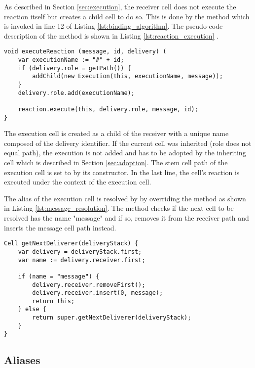 As described in Section \ref{sec:execution}, the receiver cell does not execute the reaction itself but creates a child cell to do so. This is done by the method  which is invoked in line 12 of Listing \ref{lst:binding_algorithm}. The pseudo-code description of the method is shown in Listing \ref{lst:reaction_execution} . 

\begin{lstlisting}[mathescape, float=htb, label=lst:reaction_execution, 
caption=Execution of reaction]
void executeReaction (message, id, delivery) (
	var executionName := "#" + id;
	if (delivery.role = getPath()) {
		addChild(new Execution(this, executionName, message));
	}
	delivery.role.add(executionName);

	reaction.execute(this, delivery.role, message, id);
}
\end{lstlisting}

The execution cell is created as a child of the receiver with a unique name composed of the delivery identifier. If the current cell was inherited (role does not equal path), the execution is not added and has to be adopted by the inheriting cell which is described in Section \ref{sec:adoption}. The stem cell path of the execution cell is set to  by its constructor. In the last line, the cell's reaction is executed under the context of the execution cell.

The  alias of the execution cell is resolved by  by overriding the  method as shown in Listing \ref{lst:message_resolution}. The method checks if the next cell to be resolved has the name "message" and if so, removes it from the receiver path and inserts the message cell path instead.

\begin{lstlisting}[mathescape, float=htb, label=lst:message_resolution, 
caption=Resolution of message alias]
Cell getNextDeliverer(deliveryStack) {
	var delivery = deliveryStack.first;
	var name := delivery.receiver.first;

	if (name = "message") {
		delivery.receiver.removeFirst();
		delivery.receiver.insert(0, message);
		return this;
	} else {
		return super.getNextDeliverer(deliveryStack);
	}
}
\end{lstlisting}

\subsection{Aliases}
\label{sec:aliases}

